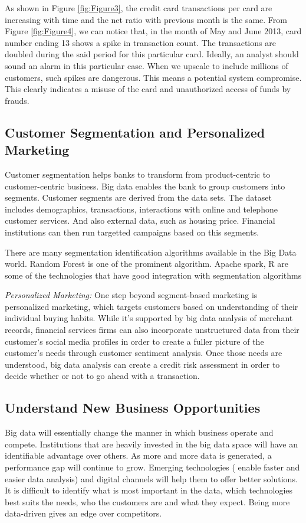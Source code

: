 \documentclass[sigconf]{acmart}
\begin{document}
As shown in Figure \ref{fig:Figure3}, the credit card transactions per card are increasing with time and the net ratio with previous month is the same.
From Figure \ref{fig:Figure4}, we can notice that, in the month of May and June 2013, card number ending 13 shows a spike in transaction count. The transactions are doubled during the said period for this particular card. Ideally, an analyst should sound an alarm in this particular case. When we upscale to include millions of customers, such spikes are dangerous. This means a potential system compromise. This clearly indicates a misuse of the card and unauthorized access of funds by frauds.



\subsection{Customer Segmentation and Personalized Marketing}

Customer segmentation helps banks to transform from product-centric to customer-centric business. Big data enables the bank to group customers into segments. Customer segments are derived from the data sets. The dataset includes demographics, transactions, interactions with online and telephone customer services. And also external data, such as housing price. Financial institutions can then run targetted campaigns based on this segments\cite{5-big-data-use-cases-in-banking-and-financial-services}.

There are many segmentation identification algorithms available in the Big Data world.  Random Forest is one of the prominent algorithm. Apache spark, R are some of the technologies that have good integration with segmentation algorithms

\textit{Personalized Marketing:} One step beyond segment-based marketing is personalized marketing, which targets customers based on understanding of their individual buying habits. While it's supported by big data analysis of merchant records, financial services firms can also incorporate unstructured data from their customer's social media profiles in order to create a fuller picture of the customer's needs through customer sentiment analysis. Once those needs are understood, big data analysis can create a credit risk assessment in order to decide whether or not to go ahead with a transaction\cite{5-big-data-use-cases-in-banking-and-financial-services}.

    
\subsection{Understand New Business Opportunities}
Big data will essentially change the manner in which business operate and compete. Institutions that are heavily invested in the big data space will have an identifiable advantage over others. As more and more data is generated, a performance gap will continue to grow. Emerging technologies ( enable faster and easier data analysis) and digital channels will help them to offer better solutions. It is difficult to identify what is most important in the data, which technologies best suits the needs, who the customers are and what they expect. Being more data-driven gives an edge over competitors\cite{bigdata-ey}.
\end{document}
